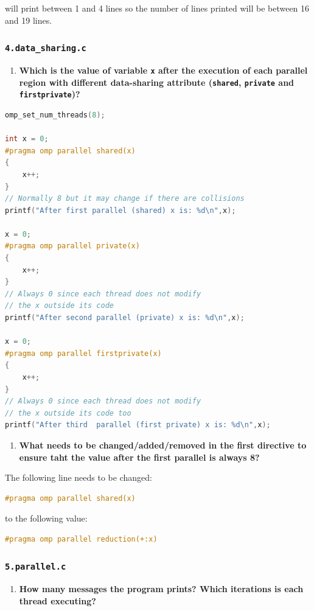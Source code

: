 \documentclass[a4paper]{article}
\begin{document}
will print between 1 and 4 lines so the number of lines printed will be
between 16 and 19 lines.

\subsubsection{\texttt{4.data\_sharing.c}}

\begin{enumerate}
	\item \textbf{Which is the value of variable \texttt{x} after the execution of each parallel region with different data-sharing attribute (\texttt{shared}, \texttt{private} and \texttt{firstprivate})?}
\end{enumerate}

\begin{lstlisting}[language=C]
omp_set_num_threads(8);

int x = 0;
#pragma omp parallel shared(x)
{
	x++;
}
// Normally 8 but it may change if there are collisions
printf("After first parallel (shared) x is: %d\n",x);

x = 0;
#pragma omp parallel private(x)
{	 
	x++;
}
// Always 0 since each thread does not modify 
// the x outside its code
printf("After second parallel (private) x is: %d\n",x);

x = 0;
#pragma omp parallel firstprivate(x)
{
	x++;
}
// Always 0 since each thread does not modify 
// the x outside its code too
printf("After third  parallel (first private) x is: %d\n",x);
\end{lstlisting}

\begin{enumerate}[resume]
	\item \textbf{What needs to be changed/added/removed in the first directive to ensure taht the value after the first parallel is always 8?}
\end{enumerate}

The following line needs to be changed:
\begin{lstlisting}[language=C]
#pragma omp parallel shared(x)
\end{lstlisting}

to the following value:
\begin{lstlisting}[language=C]
#pragma omp parallel reduction(+:x)
\end{lstlisting}

\subsubsection{\texttt{5.parallel.c}}
\begin{enumerate}
	\item \textbf{How many messages the program prints? Which iterations is each thread executing?}
\end{enumerate}
\end{document}
